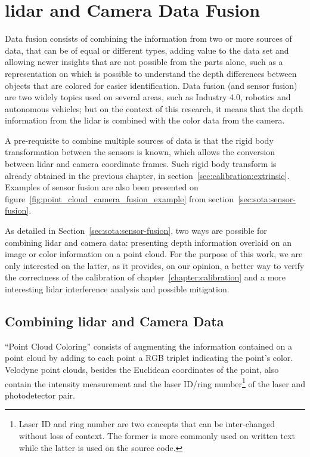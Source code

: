 \chapter{\ac{lidar} and Camera Data Fusion}
\label{chapter:sensor-fusion}

Data fusion consists of combining the information from two or more sources of data, that can be of equal or different types, adding value to the data set and allowing newer insights that are not possible from the parts alone, such as a representation on which is possible to understand the depth differences  between objects that are colored for easier identification. Data fusion (and sensor fusion) are two widely topics used on several areas, such as Industry 4.0, robotics and autonomous vehicles; but on the context of this research, it means that the depth information from the \ac{lidar} is combined with the color data from the camera.

A pre-requisite to combine multiple sources of data is that the rigid body transformation between the sensors is known, which allows the conversion between \ac{lidar} and camera coordinate frames. Such rigid body transform is already obtained in the previous chapter, in section~\ref{sec:calibration:extrinsic}. Examples of sensor fusion are also been presented on figure~\ref{fig:point_cloud_camera_fusion_example} from section~\ref{sec:sota:sensor-fusion}.

As detailed in Section~\ref{sec:sota:sensor-fusion}, two ways are possible for combining \ac{lidar} and camera data: presenting depth information overlaid on an image or color information on a point cloud. For the purpose of this work, we are only interested on the latter, as it provides, on our opinion, a better way to verify the correctness of the calibration of chapter~\ref{chapter:calibration} and a more interesting \ac{lidar} interference analysis and possible mitigation.

\section{Combining \ac{lidar} and Camera Data}
``Point Cloud Coloring'' consists of augmenting the information contained on a point cloud by adding to each point a RGB triplet indicating the point's color. Velodyne point clouds, besides the Euclidean coordinates of the point, also contain the intensity measurement and the laser ID/ring number\footnote{Laser ID and ring number are two concepts that can be inter-changed without loss of context. The former is more commonly used on written text while the latter is used on the source code.} of the laser and photodetector pair.

